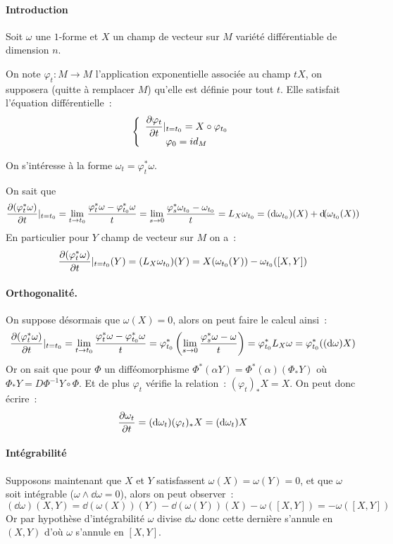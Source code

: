 \documentclass[a4paper]{article}
\begin{document}
\paragraph{Introduction} Soit $\omega$ une $1$-forme et $X$ un champ de vecteur sur $M$ variété différentiable de dimension $n$.

On note $\varphi_t : M \rightarrow M$ l'application exponentielle associée au champ $tX$, on supposera (quitte à remplacer $M$) qu'elle est définie pour tout $t$.
Elle satisfait l'équation différentielle~:
\[
\left\lbrace
\begin{array}{c}
\dfrac{\partial{\varphi_t}}{\partial{t}}|_{t=t_0}  = X \circ \varphi_{t_0} \\ 
\varphi_0 = id_M
\end{array} \right.
\]

On s'intéresse à la forme $\omega_t = \varphi^*_t \omega$.

On sait que 
\[
\dfrac{\partial{(\varphi_t^* \omega)}}{\partial{t}}|_{t=t_0} = \lim_{t \rightarrow t_0} \dfrac{\varphi^*_t \omega - \varphi^*_{t_0} \omega}{t} 
= \lim_{s \rightarrow 0} \dfrac{\varphi^*_s \omega_{t_0} - \omega_{t_0}}{t}
= L_X \omega_{t_0} = (\operatorname{d\!} \omega_{t_0})(X) + \operatorname{d\!} (\omega_{t_0}(X))
\]
En particulier pour $Y$ champ de vecteur sur $M$ on a~:
\[
\dfrac{\partial{(\varphi_t^* \omega)}}{\partial{t}}|_{t=t_0} (Y) = (L_X \omega_{t_0}) (Y) = X(\omega_{t_0}(Y)) - \omega_{t_0}([X,Y])
\]

\paragraph{Orthogonalité.} On suppose désormais que $\omega(X)=0$, alors on peut faire le calcul ainsi~:
\[
\dfrac{\partial{(\varphi_t^* \omega)}}{\partial{t}}|_{t=t_0} = \lim_{t \rightarrow t_0} \dfrac{\varphi^*_t \omega - \varphi^*_{t_0} \omega}{t} 
= \varphi^*_{t_0}\left(\lim_{s \rightarrow 0} \dfrac{\varphi^*_s \omega - \omega}{t}\right)
= \varphi^*_{t_0}L_X \omega = \varphi^*_{t_0}((\operatorname{d\!} \omega)X)
\]
Or on sait que pour $\Phi$ un difféomorphisme $\Phi^*(\alpha Y) = \Phi^*(\alpha)(\Phi_* Y)$ où $\Phi_* Y = D\Phi^{-1} Y \circ \Phi$. Et de plus $\varphi_t$ vérifie la relation~: $(\varphi_{t})_*X = X$. On peut donc écrire~:
\[
\dfrac{\partial{\omega_t}}{\partial{t}} = (\operatorname{d\!} \omega_{t}) (\varphi_{t})_*X = (\operatorname{d\!} \omega_t) X
\]


\paragraph{Intégrabilité} Supposons maintenant que $X$ et $Y$ satisfassent $\omega(X) = \omega(Y) = 0$, et que $\omega$ soit intégrable ($\omega \wedge \dd \omega = 0$), alors on peut observer~:
\[
(\dd \omega)(X,Y) = \dd (\omega(X))(Y) - \dd (\omega(Y))(X) - \omega([X,Y]) = - \omega([X,Y])
\]
Or par hypothèse d'intégrabilité $\omega$ divise $\dd \omega$ donc cette dernière s'annule en $(X,Y)$ d'où $\omega$ s'annule en $[X,Y]$.
\end{document}
